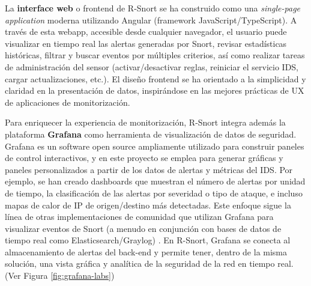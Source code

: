 \documentclass[11pt,a4paper,twoside]{report}
\begin{document}
La \textbf{interface web} o frontend de R-Snort se ha construido como una \textit{single-page application} moderna utilizando Angular (framework JavaScript/TypeScript). A través de esta webapp, accesible desde cualquier navegador, el usuario puede visualizar en tiempo real las alertas generadas por Snort, revisar estadísticas históricas, filtrar y buscar eventos por múltiples criterios, así como realizar tareas de administración del sensor (activar/desactivar reglas, reiniciar el servicio IDS, cargar actualizaciones, etc.). El diseño frontend se ha orientado a la simplicidad y claridad en la presentación de datos, inspirándose en las mejores prácticas de UX de aplicaciones de monitorización.\newline

Para enriquecer la experiencia de monitorización, R-Snort integra además la plataforma \textbf{Grafana} como herramienta de visualización de datos de seguridad. Grafana es un software open source ampliamente utilizado para construir paneles de control interactivos, y en este proyecto se emplea para generar gráficas y paneles personalizados a partir de los datos de alertas y métricas del IDS. Por ejemplo, se han creado dashboards que muestran el número de alertas por unidad de tiempo, la clasificación de las alertas por severidad o tipo de ataque, e incluso mapas de calor de IP de origen/destino más detectadas. Este enfoque sigue la línea de otras implementaciones de comunidad que utilizan Grafana para visualizar eventos de Snort (a menudo en conjunción con bases de datos de tiempo real como Elasticsearch/Graylog) \cite{GrafanaForum2020}. En R-Snort, Grafana se conecta al almacenamiento de alertas del back-end y permite tener, dentro de la misma solución, una vista gráfica y analítica de la seguridad de la red en tiempo real. (Ver Figura \ref{fig:grafana-labs})\newline
\end{document}
